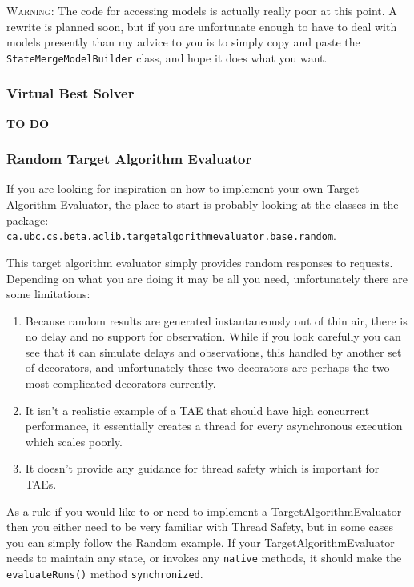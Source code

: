 \documentclass[11pt,letterpaper,oneside]{article}
\begin{document}
{\Large \textsc{Warning:}} The code for accessing models is actually really poor at this point. A rewrite is planned soon, but if you are unfortunate enough to have to deal with models presently than my advice to you is to simply copy and paste the \texttt{StateMergeModelBuilder} class, and hope it does what you want.

\subsubsection{Virtual Best Solver}

\textbf{TO DO}

\subsubsection{Random Target Algorithm Evaluator}

If you are looking for inspiration on how to implement your own Target Algorithm Evaluator, the place to start is probably looking at the classes in the package: \\
\texttt{ca.ubc.cs.beta.aclib.targetalgorithmevaluator.base.random}.

This target algorithm evaluator simply provides random responses to requests. Depending on what you are doing it may be all you need, unfortunately there are some limitations:

\begin{enumerate}
\item Because random results are generated instantaneously out of thin air, there is no delay and no support for observation. While if you look carefully you can see that it can simulate delays and observations, this handled by another set of decorators, and unfortunately these two decorators are perhaps the two most complicated decorators currently.
\item It isn't a realistic example of a TAE that should have high concurrent performance, it essentially creates a thread for every asynchronous execution which scales poorly.
\item It doesn't provide any guidance for thread safety which is important for TAEs.
\end{enumerate}

As a rule if you would like to or need to implement a TargetAlgorithmEvaluator then you either need to be very familiar with Thread Safety, but in some cases you can simply follow the Random example. If your TargetAlgorithmEvaluator needs to maintain any state, or invokes any \texttt{native} methods, it should make the \texttt{evaluateRuns()} method \texttt{synchronized}.
\end{document}
